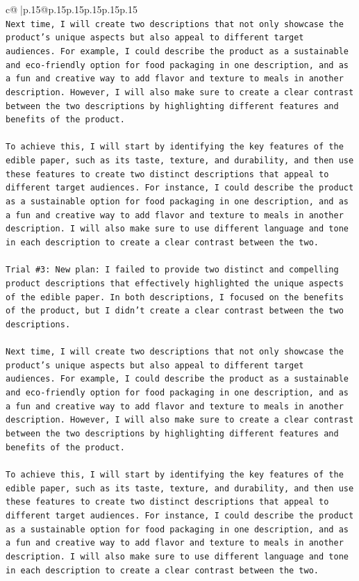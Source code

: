 \documentclass{article}
\begin{document}
{\begin{supertabular}{c@{$\;$}|p{.15\linewidth}@{}p{.15\linewidth}p{.15\linewidth}p{.15\linewidth}p{.15\linewidth}p{.15\linewidth}}
{{{\\ 
\texttt{Next time, I will create two descriptions that not only showcase the product's unique aspects but also appeal to different target audiences. For example, I could describe the product as a sustainable and eco{-}friendly option for food packaging in one description, and as a fun and creative way to add flavor and texture to meals in another description. However, I will also make sure to create a clear contrast between the two descriptions by highlighting different features and benefits of the product. } \\
\\ 
\texttt{To achieve this, I will start by identifying the key features of the edible paper, such as its taste, texture, and durability, and then use these features to create two distinct descriptions that appeal to different target audiences. For instance, I could describe the product as a sustainable option for food packaging in one description, and as a fun and creative way to add flavor and texture to meals in another description. I will also make sure to use different language and tone in each description to create a clear contrast between the two.} \\
\\ 
\texttt{Trial \#3: New plan: I failed to provide two distinct and compelling product descriptions that effectively highlighted the unique aspects of the edible paper. In both descriptions, I focused on the benefits of the product, but I didn't create a clear contrast between the two descriptions. } \\
\\ 
\texttt{Next time, I will create two descriptions that not only showcase the product's unique aspects but also appeal to different target audiences. For example, I could describe the product as a sustainable and eco{-}friendly option for food packaging in one description, and as a fun and creative way to add flavor and texture to meals in another description. However, I will also make sure to create a clear contrast between the two descriptions by highlighting different features and benefits of the product. } \\
\\ 
\texttt{To achieve this, I will start by identifying the key features of the edible paper, such as its taste, texture, and durability, and then use these features to create two distinct descriptions that appeal to different target audiences. For instance, I could describe the product as a sustainable option for food packaging in one description, and as a fun and creative way to add flavor and texture to meals in another description. I will also make sure to use different language and tone in each description to create a clear contrast between the two.} \\
}}}
\end{supertabular}}
\end{document}
